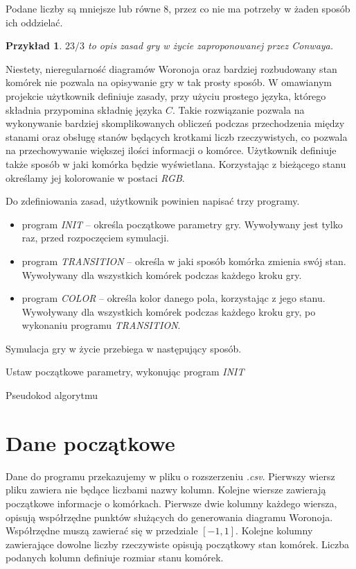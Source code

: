 \documentclass[declaration,shortabstract, inz]{iithesis}
\theoremstyle{definition} \newtheorem{definition}{Definicja}[]
\theoremstyle{plain} \newtheorem{remark}[definition]{Obserwacja}
\theoremstyle{plain} \newtheorem{theorem}[definition]{Twierdzenie}
\theoremstyle{plain} \newtheorem{example}{Przykład}[definition]
\theoremstyle{plain} \newtheorem{lemma}[definition]{Lemat}
\begin{document}
Podane liczby są mniejsze lub równe $8$, przez co nie ma potrzeby w żaden sposób ich oddzielać.

\begin{example}
$23/3$ to opis zasad gry w życie zaproponowanej przez Conwaya.
\end{example}

Niestety, nieregularność diagramów Woronoja oraz bardziej rozbudowany stan komórek nie pozwala na opisywanie gry w tak prosty sposób. W omawianym projekcie użytkownik definiuje zasady, przy użyciu prostego języka, którego składnia przypomina składnię języka $C$. Takie rozwiązanie pozwala na wykonywanie bardziej skomplikowanych obliczeń podczas przechodzenia między stanami oraz obsługę stanów będących krotkami liczb rzeczywistych, co pozwala na przechowywanie większej ilości informacji o komórce. Użytkownik definiuje także sposób w jaki komórka będzie wyświetlana. Korzystając z bieżącego stanu określamy jej kolorowanie w postaci \textit{RGB}.

Do zdefiniowania zasad, użytkownik powinien napisać trzy programy. 
\begin{itemize}
\item program \textit{INIT} -- określa początkowe parametry gry. Wywoływany jest tylko raz, przed rozpoczęciem symulacji.
\item program \textit{TRANSITION} -- określa w jaki sposób komórka zmienia swój stan. Wywoływany dla wszystkich komórek podczas każdego kroku gry.
\item program \textit{COLOR} -- określa kolor danego pola, korzystając z jego stanu. Wywoływany dla wszystkich komórek podczas każdego kroku gry, po wykonaniu programu \textit{TRANSITION}.
\end{itemize}

Symulacja gry w życie przebiega w następujący sposób.

\begin{algorithm}[H]
\SetAlgoLined
	Ustaw początkowe parametry, wykonując program \textit{INIT}\\
 \caption{Pseudokod algorytmu}
\end{algorithm}

\section{Dane początkowe}
Dane do programu przekazujemy w pliku o rozszerzeniu \textit{.csv}. Pierwszy wiersz pliku zawiera nie będące liczbami nazwy kolumn. Kolejne wiersze zawierają początkowe informacje o komórkach. Pierwsze dwie kolumny każdego wiersza, opisują współrzędne punktów służących do generowania diagramu Woronoja.  Współrzędne muszą zawierać się w przedziale $[-1, 1]$. Kolejne kolumny zawierające dowolne liczby rzeczywiste opisują początkowy stan komórek. Liczba podanych kolumn definiuje rozmiar stanu komórek.
\end{document}
